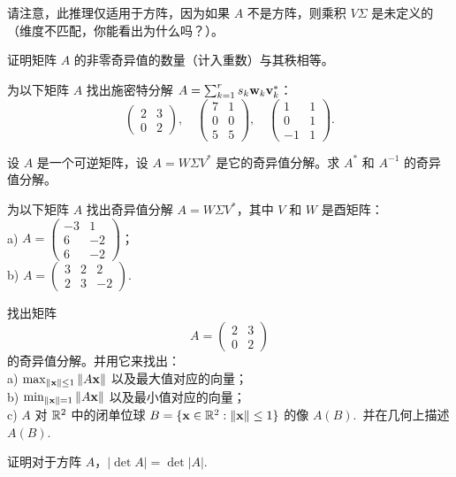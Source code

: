 请注意，此推理仅适用于方阵，因为如果 $A$ 不是方阵，则乘积 $V\Sigma$ 是未定义的（维度不匹配，你能看出为什么吗？）。

\begin{problemset}
\item \label{ex:06-03-01} 证明矩阵 $A$ 的非零奇异值的数量（计入重数）与其秩相等。
\item \label{ex:06-03-02} 为以下矩阵 $A$ 找出施密特分解 $A = \sum_{k=1}^r s_k \mathbf{w}_k \mathbf{v}_k^*$：
$$\begin{pmatrix} 2 & 3 \\ 0 & 2 \end{pmatrix},\quad \begin{pmatrix} 7 & 1 \\ 0 & 0 \\ 5 & 5 \end{pmatrix}, \quad \begin{pmatrix} 1 & 1 \\ 0 & 1 \\ -1 & 1 \end{pmatrix}.$$
\item \label{ex:06-03-03} 设 $A$ 是一个可逆矩阵，设 $A = W \Sigma V^*$ 是它的奇异值分解。求 $A^*$ 和 $A^{-1}$ 的奇异值分解。
\item \label{ex:06-03-04} 为以下矩阵 $A$ 找出奇异值分解 $A = W \Sigma V^*$，其中 $V$ 和 $W$ 是酉矩阵：
\\
a) $A = \begin{pmatrix} -3 & 1 \\ 6 & -2 \\ 6 & -2 \end{pmatrix}$；
\\
b) $A = \begin{pmatrix} 3 & 2 & 2 \\ 2 & 3 & -2 \end{pmatrix}$.~
\item \label{ex:06-03-05} 找出矩阵
$$A = \begin{pmatrix} 2 & 3 \\ 0 & 2 \end{pmatrix}$$
的奇异值分解。并用它来找出：
\\
a) $\max_{\|\mathbf{x}\| \leq 1} \|A\mathbf{x}\|$ 以及最大值对应的向量；
\\
b) $\min_{\|\mathbf{x}\|=1} \|A\mathbf{x}\|$ 以及最小值对应的向量；
\\
c) $A$ 对 $\mathbb{R}^2$ 中的闭单位球 $B = \{\mathbf{x} \in \mathbb{R}^2 : \|\mathbf{x}\| \leq 1\}$ 的像 $A(B)$.~并在几何上描述 $A(B)$.~
\item \label{ex:06-03-06} 证明对于方阵 $A$，$|\det A| = \det |A|$.~

\end{problemset}
